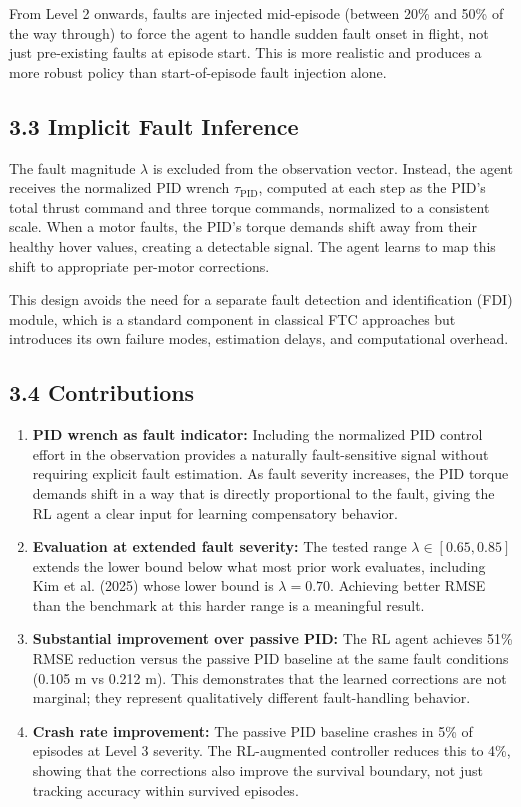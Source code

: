 \documentclass[12pt,letterpaper]{article}
\begin{document}
From Level 2 onwards, faults are injected mid-episode (between 20\% and 50\% of the way through) to force the agent to handle sudden fault onset in flight, not just pre-existing faults at episode start. This is more realistic and produces a more robust policy than start-of-episode fault injection alone.

\subsection*{3.3 Implicit Fault Inference}

The fault magnitude $\lambda$ is excluded from the observation vector. Instead, the agent receives the normalized PID wrench $\hat{\tau}_{\text{PID}}$, computed at each step as the PID's total thrust command and three torque commands, normalized to a consistent scale. When a motor faults, the PID's torque demands shift away from their healthy hover values, creating a detectable signal. The agent learns to map this shift to appropriate per-motor corrections.

This design avoids the need for a separate fault detection and identification (FDI) module, which is a standard component in classical FTC approaches but introduces its own failure modes, estimation delays, and computational overhead.

\subsection*{3.4 Contributions}

\begin{enumerate}[leftmargin=*]
\item \textbf{PID wrench as fault indicator:} Including the normalized PID control effort in the observation provides a naturally fault-sensitive signal without requiring explicit fault estimation. As fault severity increases, the PID torque demands shift in a way that is directly proportional to the fault, giving the RL agent a clear input for learning compensatory behavior.

\item \textbf{Evaluation at extended fault severity:} The tested range $\lambda \in [0.65, 0.85]$ extends the lower bound below what most prior work evaluates, including Kim et al. (2025) whose lower bound is $\lambda = 0.70$. Achieving better RMSE than the benchmark at this harder range is a meaningful result.

\item \textbf{Substantial improvement over passive PID:} The RL agent achieves 51\% RMSE reduction versus the passive PID baseline at the same fault conditions (0.105 m vs 0.212 m). This demonstrates that the learned corrections are not marginal; they represent qualitatively different fault-handling behavior.

\item \textbf{Crash rate improvement:} The passive PID baseline crashes in 5\% of episodes at Level 3 severity. The RL-augmented controller reduces this to 4\%, showing that the corrections also improve the survival boundary, not just tracking accuracy within survived episodes.
\end{enumerate}
\end{document}
